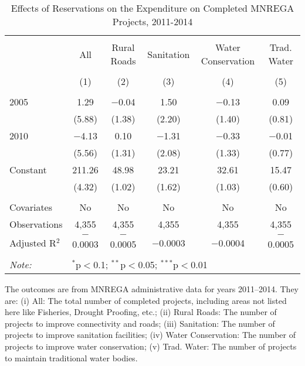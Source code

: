 \begin{table}[!htbp]
\centering
\begin{threeparttable}

  \caption{Effects of Reservations on the Expenditure on Completed MNREGA Projects, 2011-2014} 
  \label{main_mnrega_expenditure} 
\scriptsize 
\begin{tabular}{@{\extracolsep{0pt}}lccccc} 
\\[-1.8ex]\hline 
\hline \\[-1.8ex] 
 & All & Rural Roads & Sanitation & Water Conservation & Trad. Water \\ 
\\[-1.8ex] & (1) & (2) & (3) & (4) & (5)\\ 
\hline \\[-1.8ex] 
 2005 & 1.29 & $-$0.04 & 1.50 & $-$0.13 & 0.09 \\ 
  & (5.88) & (1.38) & (2.20) & (1.40) & (0.81) \\ 
  2010 & $-$4.13 & 0.10 & $-$1.31 & $-$0.33 & $-$0.01 \\ 
  & (5.56) & (1.31) & (2.08) & (1.33) & (0.77) \\ 
  Constant & 211.26 & 48.98 & 23.21 & 32.61 & 15.47 \\ 
  & (4.32) & (1.02) & (1.62) & (1.03) & (0.60) \\ 
 \hline \\[-1.8ex] 
Covariates & No & No & No & No & No \\ 
Observations & 4,355 & 4,355 & 4,355 & 4,355 & 4,355 \\ 
Adjusted R$^{2}$ & $-$0.0003 & $-$0.0005 & $-$0.0003 & $-$0.0004 & $-$0.0005 \\ 
\hline 
\hline \\[-1.8ex] 
\textit{Note:}  & \multicolumn{5}{l}{$^{*}$p$<$0.1; $^{**}$p$<$0.05; $^{***}$p$<$0.01} \\ 
\end{tabular} 
\begin{tablenotes}[flushleft]
\scriptsize
\item The outcomes are from MNREGA administrative data for years 2011--2014. They are: 
(i) All: The total number of completed projects, including areas not listed here like Fisheries, Drought Proofing, etc.;
(ii) Rural Roads: The number of projects to improve connectivity and roads;
(iii) Sanitation: The number of projects to improve sanitation facilities;
(iv) Water Conservation: The number of projects to improve water conservation;
(v) Trad. Water: The number of projects to maintain traditional water bodies.
\end{tablenotes}
\end{threeparttable}
\end{table}
